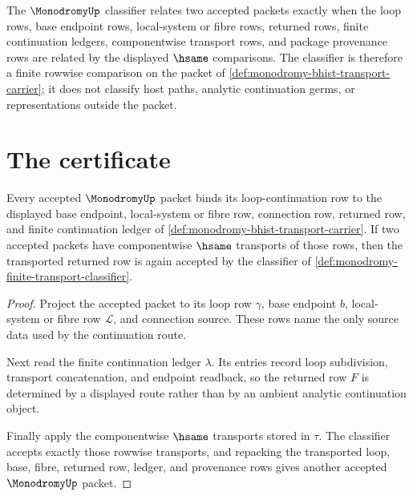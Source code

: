 \begin{definition}
\label{def:monodromy-finite-transport-classifier}
The $\MonodromyUp$ classifier relates two accepted packets exactly when the loop rows, base endpoint rows, local-system or fibre rows, returned rows, finite continuation ledgers, componentwise transport rows, and package provenance rows are related by the displayed $\hsame$ comparisons. The classifier is therefore a finite rowwise comparison on the packet of \autoref{def:monodromy-bhist-transport-carrier}; it does not classify host paths, analytic continuation germs, or representations outside the packet.
\end{definition}

\section{The certificate}
\label{sec:monodromy-certificate}

\begin{theorem}
\label{thm:monodromy-loop-continuation-obligation}
Every accepted $\MonodromyUp$ packet binds its loop-continuation row to the displayed base endpoint, local-system or fibre row, connection row, returned row, and finite continuation ledger of \autoref{def:monodromy-bhist-transport-carrier}. If two accepted packets have componentwise $\hsame$ transports of those rows, then the transported returned row is again accepted by the classifier of \autoref{def:monodromy-finite-transport-classifier}.
\end{theorem}
\begin{proof}
Project the accepted packet to its loop row $\gamma$, base endpoint $b$, local-system or fibre row $\mathcal L$, and connection source. These rows name the only source data used by the continuation route.

Next read the finite continuation ledger $\lambda$. Its entries record loop subdivision, transport concatenation, and endpoint readback, so the returned row $F$ is determined by a displayed route rather than by an ambient analytic continuation object.

Finally apply the componentwise $\hsame$ transports stored in $\tau$. The classifier accepts exactly those rowwise transports, and repacking the transported loop, base, fibre, returned row, ledger, and provenance rows gives another accepted $\MonodromyUp$ packet.
\end{proof}

